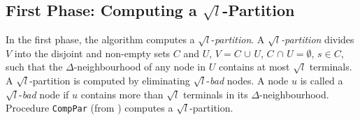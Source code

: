 \subsection{First Phase: Computing a $\sqrt{l}$-Partition}


In the first phase, the algorithm computes a \mbox{$\sqrt{l}$-\emph{partition}}. 
A \emph{$\sqrt{l}$-partition} divides $V$ into the disjoint and non-empty sets $C$ and $U$, $V = C$ $\cup$ $U$, $C$ $\cap$ $U = \emptyset$, \linebreak
$s \in C$, such that the $\Delta$-neighbourhood of any node in $U$ contains at most $\sqrt{l}$ terminals. A \mbox{$\sqrt{l}$-partition} is computed 
by eliminating $\sqrt{l}$-\emph{bad} nodes. A node $u$ is called a \mbox{$\sqrt{l}$-\emph{bad}} node if $u$ contains more than $\sqrt{l}$ 
terminals in its \mbox{$\Delta$-neighbourhood}. Procedure \verb|CompPar| (from \cite{Elkin2006}) computes a $\sqrt{l}$-partition.

